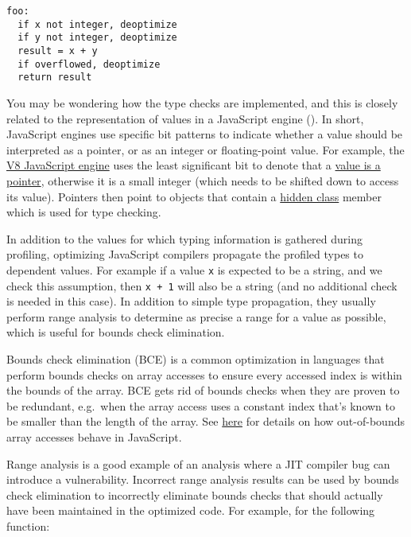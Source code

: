 \documentclass[
  a4paper,
]{report}
\begin{document}
\begin{verbatim}
foo:
  if x not integer, deoptimize
  if y not integer, deoptimize
  result = x + y
  if overflowed, deoptimize
  return result
\end{verbatim}

You may be wondering how the type checks are implemented, and this is
closely related to the representation of values in a JavaScript engine
(). In short, JavaScript engines use
specific bit patterns to indicate whether a value should be interpreted
as a pointer, or as an integer or floating-point value. For example, the
\href{https://v8.dev/}{V8 JavaScript engine} uses the least significant
bit to denote that a
\href{https://v8.dev/blog/pointer-compression\#value-tagging-in-v8}{value
is a pointer}, otherwise it is a small integer (which needs to be
shifted down to access its value). Pointers then point to objects that
contain a \href{https://v8.dev/docs/hidden-classes}{hidden class} member
which is used for type checking.

In addition to the values for which typing information is gathered
during profiling, optimizing JavaScript compilers propagate the profiled
types to dependent values. For example if a value \texttt{x} is expected
to be a string, and we check this assumption, then \texttt{x\ +\ 1} will
also be a string (and no additional check is needed in this case). In
addition to simple type propagation, they usually perform
\label{__index_entry_92}{range
analysis} to determine as precise a range for a
value as possible, which is useful for
\label{__index_entry_93}{bounds check
elimination}.

\label{__index_entry_94}{Bounds check elimination
(BCE)} is a common optimization in
languages that perform bounds checks on array accesses to ensure every
accessed index is within the bounds of the array. BCE gets rid of bounds
checks when they are proven to be redundant, e.g.~when the array access
uses a constant index that's known to be smaller than the length of the
array. See
\href{https://developer.mozilla.org/en-US/docs/Web/JavaScript/Reference/Global_Objects/Array/length}{here}
for details on how out-of-bounds array accesses behave in JavaScript.

Range analysis is a good example of an analysis where a JIT compiler bug
can introduce a vulnerability. Incorrect range analysis results can be
used by bounds check elimination to incorrectly eliminate bounds checks
that should actually have been maintained in the optimized code. For
example, for the following function:
\end{document}
